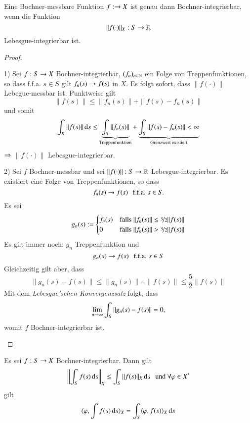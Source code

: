 \begin{theorem}\label{4.26}
    Eine Bochner-messbare Funktion $f:\rightarrow X$ ist genau dann Bochner-integrierbar, wenn die Funktion
    \[
        \|f(\cdot)\|_X :S \rightarrow \mathbb{R}
    \]
    Lebesgue-integrierbar ist.
\end{theorem}

\begin{proof}
    \begin{description}
    \item{1)}
    Sei $f:S\rightarrow X$ Bochner-integrierbar, $(f_n)_{n\in \mathbb{N}}$ ein Folge von Treppenfunktionen, so dass
    f.f.a. $s\in S$ gilt $f_n(s)\rightarrow f(s)$ in $X$. Es folgt sofort, dass $\|f(\cdot)\|$ Lebegue-messbar
     ist. Punktweise gilt
     \[
        \|f(s)\|\leq \|f_n(s)\|+ \|f(s)-f_n(s)\|
     \]
     und somit
     \[
        \int_S\|f(s)\|\, \mathrm{d} s\leq \underbrace{\int_S\|f_n(s)\|}_{\text{Treppenfunktion}}
            + \underbrace{\int_S\|f(s)-f_n(s)\|<\infty}_{\text{Grenzwert existiert}}
     \]
    $\Rightarrow$ $\|f(\cdot)\|$ Lebesgue-integrierbar.
    \item{2)}
    Sei $f$ Bochner-messbar und sei $\|f(\cdot)\|:S \rightarrow \mathbb{R}$ Lebesgue-integrierbar. Es existiert eine
    Folge von Treppenfunktionen, so dass
    \[
        f_n(s) \rightarrow f(s) \hspace{.25cm} \text{f.f.a. } s\in S .
    \]
    Es sei
    \[
        g_n(s):= \begin{cases} f_n(s)& \text{falls } \|f_n(s)\|\leq \nicefrac32 \|f(s)\| \\
                 0&\text{falls } \|f_n(s)\|>\nicefrac32 \|f(s)\|\end{cases}
    \]
    Es gilt immer noch: $g_n$ Treppenfunktion und
    \[
        g_n(s)\rightarrow f(s) \hspace{.25cm} \text{f.f.a. } s\in S
    \]
    Gleichzeitig gilt aber, dass
    \[
        \|g_n(s)-f(s)\|\leq \|g_n(s)\|+\|f(s)\| \leq \frac52\|f(s)\|
    \]
    Mit dem \textit{Lebesgue'schen Konvergenzsatz} folgt, dass
    \[
        \lim_{n\rightarrow\infty} \int_S \|g_n(s)-f(s)\|=0,
    \]
    womit $f$ Bochner-integrierbar ist. 
    \end{description}    
    \[ \]
\end{proof}

\begin{cor}\label{4.27}
    Es sei $f:S\rightarrow X$ Bochner-integrierbar. Dann gilt
    \[
        \left\| \int_S f(s)\, \mathrm{d} s \right\|_X\leq\int_S\|f(s)\|_X \, \mathrm{d} s \hspace{.25cm}  \text{und } \forall \varphi \in X'
    \]
    gilt
    \[
        \langle \varphi, \int f(s)\, \mathrm{d} s \rangle _X = \int_S \langle \varphi, f(s)\rangle_X \, \mathrm{d} s
    \]
\end{cor}

